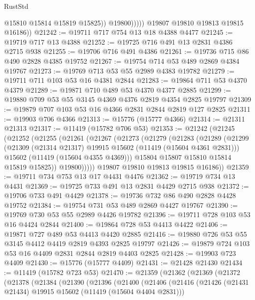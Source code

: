 \begin{lexlean}{RustStd}
\begin{coremodule}
                      @15810
                      @15814
                      @15819
                      @15825))
                  @19800)))))
        @19807
        @19810
        @19813
        @19815
        @16186))
@21242 := @19711 @717 @754 @13 @18 @4388 @4477
@21245 := @19719 @717 @13 @4388
@21252 := @19725 @716 @491 @13 @2831 @4386 @2715 @938
@21255 := @19706 @716 @491 @4386
@21261 := @19736 @715 @86 @490 @2828 @4385 @19752
@21267 := @19754 @714 @53 @489 @2869 @4384 @19767
@21273 := @19769 @713 @53 @55 @2989 @4383 @19782
@21279 := @19711 @711 @103 @53 @16 @4381 @2844
@21283 := @19864 @711 @53 @4370 @4379
@21289 := @19871 @710 @489 @53 @4370 @4377 @2885
@21299 := @19880 @709 @53 @55 @3145 @4369 @4376 @2819 @4354 @2825 @19797
@21309 := @19879 @707 @103 @53 @16 @4366 @2831 @2844 @2819 @127 @2825
@21311 := @19903 @706 @4366
@21313 := @15776 (@15777 @4366)
@21314 := @21311 @21313
@21317 := @11419 (@15782 @706 @53)
@21353 := @21242
    (@21245
      (@21252
        (@21255
          (@21261
            (@21267
              (@21273
                (@21279
                  (@21283
                    (@21289
                      (@21299
                        (@21309 (@21314 @21317) @19915 @15602 (@11419 (@15604 @4361 @2831)))
                        @15602
                        (@11419 (@15604 @4355 @4369)))
                      @15804
                      @15807
                      @15810
                      @15814
                      @15819
                      @15825))
                  @19800)))))
        @19807
        @19810
        @19813
        @19815
        @16186))
@21359 := @19711 @734 @753 @13 @17 @4431 @4476
@21362 := @19719 @734 @13 @4431
@21369 := @19725 @733 @491 @13 @2831 @4429 @2715 @938
@21372 := @19706 @733 @491 @4429
@21378 := @19736 @732 @86 @490 @2828 @4428 @19752
@21384 := @19754 @731 @53 @489 @2869 @4427 @19767
@21390 := @19769 @730 @53 @55 @2989 @4426 @19782
@21396 := @19711 @728 @103 @53 @16 @4424 @2844
@21400 := @19864 @728 @53 @4413 @4422
@21406 := @19871 @727 @489 @53 @4413 @4420 @2885
@21416 := @19880 @726 @53 @55 @3145 @4412 @4419 @2819 @4393 @2825 @19797
@21426 := @19879 @724 @103 @53 @16 @4409 @2831 @2844 @2819 @4403 @2825
@21428 := @19903 @723 @4409
@21430 := @15776 (@15777 @4409)
@21431 := @21428 @21430
@21434 := @11419 (@15782 @723 @53)
@21470 := @21359
    (@21362
      (@21369
        (@21372
          (@21378
            (@21384
              (@21390
                (@21396
                  (@21400
                    (@21406
                      (@21416
                        (@21426 (@21431 @21434) @19915 @15602 (@11419 (@15604 @4404 @2831)))

\end{coremodule}
\end{lexlean}
